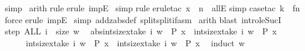 \begin{isabellebody}
\ simp{\isacharparenright}\isanewline
\ arith{\isacharparenright}\isanewline
{}rule{\isacharparenright}\isanewline
{}erule\ impE{\isacharparenright}\isanewline
\ simp{\isacharparenright}\isanewline
{}rule{\isacharparenright}\isanewline
{}erule{\isacharunderscore}tac\ x\ {\isacharequal}\ n\ \ allE{\isacharparenright}\isanewline
{}simp{\isacharparenright}\isanewline
{}case{\isacharunderscore}tac\ {\isachardoublequote}k\ {\isacharequal}\ f{\isacharparenleft}n{\isacharplus}{}{\isacharparenright}{\isachardoublequote}{\isacharparenright}\isanewline
\ force{\isacharparenright}\isanewline
{}erule\ impE{\isacharparenright}\isanewline
\ simp\ add{\isacharcolon}zabs{\isacharunderscore}def\ split{\isacharcolon}split{\isacharunderscore}if{\isacharunderscore}asm{\isacharparenright}\isanewline
\ arith{\isacharparenright}\isanewline
{}blast\ intro{\isacharcolon}le{\isacharunderscore}SucI{\isacharparenright}\isanewline
\isanewline
{}\ step{}{\isacharcolon}\ {\isachardoublequote}ALL\ i\ {\isacharless}\ size\ w{\isachardot}\isanewline
\ \ abs{\isacharparenleft}{\isacharparenleft}int{\isacharparenleft}size{\isacharbrackleft}x{\isacharcolon}take\ {\isacharparenleft}i{\isacharplus}{}{\isacharparenright}\ w\ {\isachardot}\ P\ x{\isacharbrackright}{\isacharparenright}\ {\isacharminus}\ int{\isacharparenleft}size{\isacharbrackleft}x{\isacharcolon}take\ {\isacharparenleft}i{\isacharplus}{}{\isacharparenright}\ w\ {\isachardot}\ {\isachartilde}P\ x{\isacharbrackright}{\isacharparenright}{\isacharparenright}\ {\isacharminus}\isanewline
\ \ \ \ \ \ {\isacharparenleft}int{\isacharparenleft}size{\isacharbrackleft}x{\isacharcolon}take\ i\ w\ {\isachardot}\ P\ x{\isacharbrackright}{\isacharparenright}\ {\isacharminus}\ int{\isacharparenleft}size{\isacharbrackleft}x{\isacharcolon}take\ i\ w\ {\isachardot}\ {\isachartilde}P\ x{\isacharbrackright}{\isacharparenright}{\isacharparenright}{\isacharparenright}\ {\isacharless}{\isacharequal}\ {\isacharhash}{}{\isachardoublequote}\isanewline
{}induct\ w{\isacharparenright}\isanewline

\end{isabellebody}
